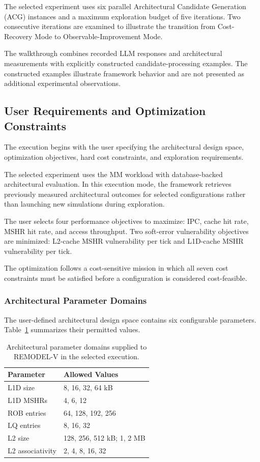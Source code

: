 The selected experiment uses six
parallel Architectural Candidate
Generation (ACG) instances and
a maximum exploration budget
of five iterations.
Two consecutive iterations
are examined to illustrate
the transition from
Cost-Recovery Mode to
Observable-Improvement Mode.

The walkthrough combines recorded
LLM responses and architectural
measurements with explicitly
constructed candidate-processing
examples. The constructed examples
illustrate framework behavior
and are not presented as
additional experimental observations.


\subsection{User Requirements and Optimization Constraints}
\label{app:case_study_requirements}

The execution begins with the user specifying
the architectural design space, optimization
objectives, hard cost constraints, and exploration
requirements.

The selected experiment uses the MM workload
with database-backed architectural evaluation.
In this execution mode, the framework retrieves
previously measured architectural outcomes for
selected configurations rather than launching
new simulations during exploration.

The user selects four performance objectives
to maximize: IPC, cache hit rate, MSHR hit rate,
and access throughput. Two soft-error vulnerability
objectives are minimized: L2-cache MSHR vulnerability
per tick and L1D-cache MSHR vulnerability per tick.

The optimization follows a cost-sensitive mission
in which all seven cost constraints must be
satisfied before a configuration is considered
cost-feasible.

\subsubsection{Architectural Parameter Domains}

The user-defined architectural design space
contains six configurable parameters.
Table~\ref{tab:appendix_design_space} summarizes
their permitted values.

\begin{table}[htbp]
\centering
\caption{Architectural parameter domains supplied
to REMODEL-V in the selected execution.}
\label{tab:appendix_design_space}
\renewcommand{\arraystretch}{1.1}
\begin{tabular}{ll}
\hline
\textbf{Parameter} & \textbf{Allowed Values} \\
\hline
L1D size & 8, 16, 32, 64 kB \\
L1D MSHRs & 4, 6, 12 \\
ROB entries & 64, 128, 192, 256 \\
LQ entries & 8, 16, 32 \\
L2 size & 128, 256, 512 kB; 1, 2 MB \\
L2 associativity & 2, 4, 8, 16, 32 \\
\hline
\end{tabular}
\end{table}

